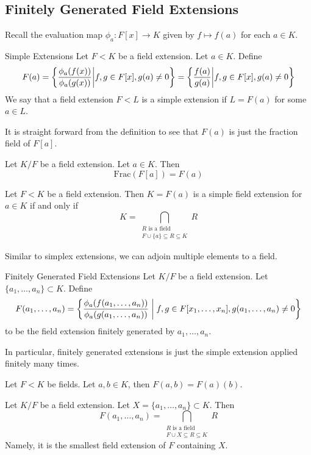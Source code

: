 \documentclass[a4paper]{article}
\begin{document}
\subsection{Finitely Generated Field Extensions}
Recall the evaluation map $\phi_a:F[x]\to K$ given by $f\mapsto f(a)$ for each $a\in K$. 

\begin{defn}{Simple Extensions}{} Let $F<K$ be a field extension. Let $a\in K$. Define 
$$F(a)=\left\{\frac{\phi_a(f(x))}{\phi_a(g(x))}\bigg{|}f,g\in F[x],g(a)\neq 0\right\}=\left\{\frac{f(a)}{g(a)}\bigg{|}f,g\in F[x],g(a)\neq 0\right\}$$
We say that a field extension $F<L$ is a simple extension if $L=F(a)$ for some $a\in L$. 
\end{defn}

It is straight forward from the definition to see that $F(a)$ is just the fraction field of $F[a]$. 

\begin{lmm}{}{} Let $K/F$ be a field extension. Let $a\in K$. Then $$\text{Frac}(F[a])=F(a)$$
\end{lmm}

\begin{prp}{}{} Let $F<K$ be a field extension. Then $K=F(a)$ is a simple field extension for $a\in K$ if and only if $$K=\bigcap_{\substack{R\text{ is a field}\\F\cup\{a\}\subseteq R\subseteq K}}R$$
\end{prp}

Similar to simplex extensions, we can adjoin multiple elements to a field. 

\begin{defn}{Finitely Generated Field Extensions}{} Let $K/F$ be a field extension. Let $\{a_1,\dots,a_n\}\subset K$. Define $$F(a_1,\dots,a_n)=\left\{\frac{\phi_a(f(a_1,\dots,a_n))}{\phi_a(g(a_1,\dots,a_n))}\;\bigg{|}\;f,g\in F[x_1,\dots,x_n],g(a_1,\dots,a_n)\neq 0\right\}$$ to be the field extension finitely generated by $a_1,\dots,a_n$. 
\end{defn}

In particular, finitely generated extensions is just the simple extension applied finitely many times. 

\begin{lmm}{}{} Let $F<K$ be fields. Let $a,b\in K$, then $F(a,b)=F(a)(b)$. 
\end{lmm}

\begin{prp}{}{} Let $K/F$ be a field extension. Let $X=\{a_1,\dots,a_n\}\subset K$. Then $$F(a_1,\dots,a_n)=\bigcap_{\substack{R\text{ is a field}\\F\cup X\subseteq R\subseteq K}}R$$ Namely, it is the smallest field extension of $F$ containing $X$. 
\end{prp}
\end{document}
